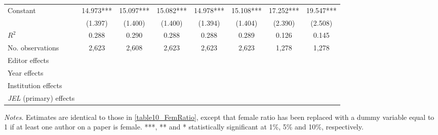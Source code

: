 \begin{table}
\begin{adjustwidth}{-0.085cm}{}
\begin{threeparttable}
\begin{tabular}{p{2.64cm}SSSSSSS}
            Constant                      &      14.973***&      15.097***&      15.082***&      14.978***&      15.108***&      17.252***&      19.547***\\
                                          &     (1.397)   &     (1.400)   &     (1.400)   &     (1.394)   &     (1.404)   &     (2.390)   &     (2.508)   \\
            \midrule
            \(R^2\)                       &       0.288   &       0.290   &       0.288   &       0.288   &       0.289   &       0.126   &       0.145   \\
            No. observations              &       2,623   &       2,608   &       2,623   &       2,623   &       2,623   &       1,278   &       1,278   \\
            \midrule
            Editor effects        &           {}   &           {}   &           {}   &           {}   &           {}   &           {}   &           {}   \\
            Year effects                  &           {}   &           {}   &           {}   &           {}   &           {}   &           {}   &           {}   \\
            Institution effects           &           {}   &           {}   &           {}   &           {}   &           {}   &           {}   &           {}   \\
            \textit{JEL} (primary) effects&               &               &               &               &               &               &           {}   \\
            \bottomrule
        \end{tabular}
        \begin{tablenotes}
            \tiny
            \item \textit{Notes}. Estimates are identical to those in \autoref{table10_FemRatio}, except that female ratio has been replaced with a dummy variable equal to 1 if at least one author on a paper is female. ***, ** and * statistically significant at 1\%, 5\% and 10\%, respectively.
        \end{tablenotes}
    \end{threeparttable}
    \end{adjustwidth}
\end{table}